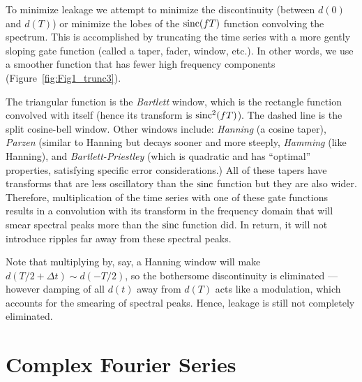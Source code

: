 	To minimize leakage we attempt to minimize the discontinuity (between $d(0)$ and $d(T)$) or 
minimize the lobes of the $\operatorname{sinc} (fT)$ function convolving the spectrum.  This is accomplished by 
truncating the time series with a more gently sloping gate function (called a taper, fader, window, 
etc.). In other words, we use a smoother function that has fewer high frequency components (Figure~\ref{fig:Fig1_trunc3}).

\noindent
{}
The triangular function is the \emph{Bartlett} window, which is the rectangle function convolved with 
itself (hence its transform is $\operatorname{sinc}^2 (fT)$).  The dashed line is the split cosine-bell window.  Other 
windows include:  \emph{Hanning} (a cosine taper), \emph{Parzen} (similar to Hanning but decays sooner and  
more steeply, \emph{Hamming} (like Hanning), and \emph{Bartlett-Priestley} (which is quadratic and has ``optimal'' properties, 
satisfying specific error considerations.)  All of these tapers have transforms that are less 
oscillatory than the $\operatorname{sinc}$ function but they are also wider. Therefore, multiplication of the time series with one 
of these gate functions results in a convolution with its transform in the frequency domain that will smear spectral peaks 
more than the $\operatorname{sinc}$ function did. In return, it will not introduce ripples far away from these spectral peaks.

	Note that multiplying by, say, a Hanning window will make $d(T/2+\Delta t) \sim d(-T/2)$, so 
the bothersome discontinuity is eliminated --- however damping of all $d(t)$ away from $d(T)$ acts like a modulation, 
which accounts for the smearing of spectral peaks. Hence, leakage is still not completely eliminated.

\section{Complex Fourier Series}

